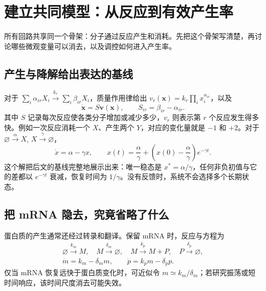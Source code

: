 \chapter{建立共同模型：从反应到有效产生率}
所有回路共享同一个骨架：分子通过反应产生和消耗。先把这个骨架写清楚，再讨论哪些微观变量可以消去，以及调控如何进入产生率。
\section{产生与降解给出表达的基线}
对于 $\sum_i\alpha_{ir}X_i\xrightarrow{k_r}\sum_i\beta_{ir}X_i$，质量作用律给出 $v_r(\bm x)=k_r\prod_i x_i^{\alpha_{ir}}$，以及
\begin{equation}\dot{\bm x}=S\bm v(\bm x),\qquad S_{ir}=\beta_{ir}-\alpha_{ir}.\end{equation}
其中 $S$ 记录每次反应使各类分子增加或减少多少，$v_r$ 则表示第 $r$ 个反应发生得多快。例如一次反应消耗一个 $X$、产生两个 $Y$，对应的变化量就是 $-1$ 和 $+2$。对于 $\varnothing\xrightarrow{\alpha}X$, $X\xrightarrow{\gamma}\varnothing$，
\begin{equation}\dot x=\alpha-\gamma x,\qquad x(t)=\frac\alpha\gamma+\left(x(0)-\frac\alpha\gamma\right)e^{-\gamma t}.\end{equation}
这个解把后文的基线完整地展示出来：唯一稳态是 $x^*=\alpha/\gamma$，任何非负初值与它的差都以 $e^{-\gamma t}$ 衰减，恢复时间为 $1/\gamma$。没有反馈时，系统不会选择多个长期状态。

\section{把 mRNA 隐去，究竟省略了什么}
蛋白质的产生通常还经过转录和翻译。保留 mRNA 时，反应与方程为
\begin{align}
\varnothing\xrightarrow{k_m}M,\quad M\xrightarrow{\delta_m}\varnothing,\quad M\xrightarrow{k_p}M+P,\quad P\xrightarrow{\delta_p}\varnothing,\\[-2pt]
\dot m=k_m-\delta_m m,\qquad\dot p=k_pm-\delta_p p.
\end{align}
仅当 mRNA 恢复远快于蛋白质变化时，可近似令 $m\simeq k_m/\delta_m$；若研究振荡或短时间响应，该时间尺度消去可能失效。


